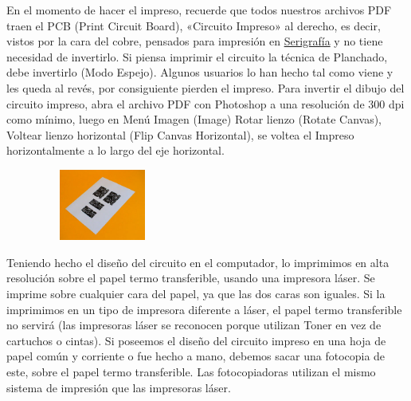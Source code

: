 \documentclass[12pt]{article}
\begin{document}

\par

En el momento de hacer el impreso, recuerde que todos nuestros archivos PDF traen el PCB (Print Circuit Board), «Circuito Impreso» al derecho, es decir, vistos por la cara del cobre, pensados para impresión en \href{http://www.construyasuvideorockola.com/fabricacion_impresos_03.php}{Serigrafía} y no tiene necesidad de invertirlo. Si  piensa imprimir el circuito la técnica de Planchado, debe invertirlo (Modo Espejo). Algunos usuarios lo han hecho tal como viene y les queda al revés, por consiguiente pierden el impreso. Para invertir el dibujo del circuito impreso, abra el archivo PDF con Photoshop a una resolución de 300 dpi como mínimo, luego en Menú Imagen (Image) Rotar lienzo (Rotate Canvas), Voltear lienzo horizontal (Flip Canvas Horizontal), se voltea el Impreso horizontalmente a lo largo del eje horizontal.\par




\begin{figure}[H]
	\begin{Center}
		\includegraphics[width=1.68in,height=0.92in]{./media/image9.jpeg}
	\end{Center}
\end{figure}



\par

Teniendo hecho el diseño del circuito en el computador, lo imprimimos en alta resolución sobre el papel termo transferible, usando una impresora láser. Se imprime sobre cualquier cara del papel, ya que las dos caras son iguales. Si la imprimimos en un tipo de impresora diferente a láser, el papel termo transferible no servirá (las impresoras láser se reconocen porque utilizan Toner en vez de cartuchos o cintas). Si poseemos el diseño del circuito impreso en una hoja de papel común y corriente o fue hecho a mano, debemos sacar una fotocopia de este, sobre el papel termo transferible. Las fotocopiadoras utilizan el mismo sistema de impresión que las impresoras láser.\par
\end{document}
